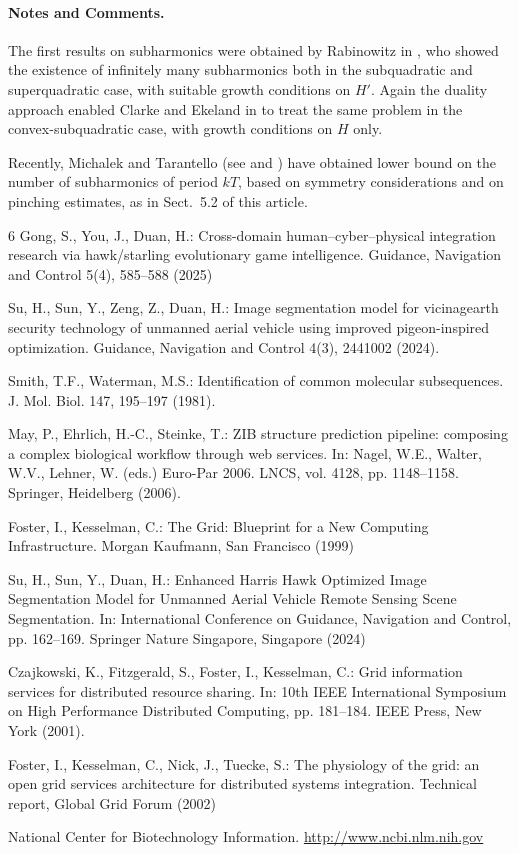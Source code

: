 \documentclass{../styles/svproc}
\begin{document}
\paragraph{Notes and Comments.}
The first results on subharmonics were
obtained by Rabinowitz in \cite{fo:kes:nic:tue}, who showed the existence of
infinitely many subharmonics both in the subquadratic and superquadratic
case, with suitable growth conditions on $H'$. Again the duality
approach enabled Clarke and Ekeland in \cite{may:ehr:stein} to treat the
same problem in the convex-subquadratic case, with growth conditions on
$H$ only.

Recently, Michalek and Tarantello (see \cite{fost:kes} and \cite{czaj:fitz})
have obtained lower bound on the number of subharmonics of period $kT$,
based on symmetry considerations and on pinching estimates, as in
Sect.~5.2 of this article.

%
%
\begin{thebibliography}{6}
%
Gong, S., You, J., Duan, H.: Cross-domain human--cyber--physical integration research via hawk/starling evolutionary game intelligence. Guidance, Navigation and Control 5(4), 585--588 (2025)

Su, H., Sun, Y., Zeng, Z., Duan, H.: Image segmentation model for vicinagearth security technology of unmanned aerial vehicle using improved pigeon-inspired optimization. Guidance, Navigation and Control 4(3), 2441002 (2024).

Smith, T.F., Waterman, M.S.: Identification of common molecular subsequences.
J. Mol. Biol. 147, 195--197 (1981).

May, P., Ehrlich, H.-C., Steinke, T.: ZIB structure prediction pipeline:
composing a complex biological workflow through web services.
In: Nagel, W.E., Walter, W.V., Lehner, W. (eds.) Euro-Par 2006.
LNCS, vol. 4128, pp. 1148--1158. Springer, Heidelberg (2006).

Foster, I., Kesselman, C.: The Grid: Blueprint for a New Computing Infrastructure.
Morgan Kaufmann, San Francisco (1999)

Su, H., Sun, Y., Duan, H.: Enhanced Harris Hawk Optimized Image Segmentation Model for Unmanned Aerial Vehicle Remote Sensing Scene Segmentation. In: International Conference on Guidance, Navigation and Control, pp. 162--169. Springer Nature Singapore, Singapore (2024)

Czajkowski, K., Fitzgerald, S., Foster, I., Kesselman, C.: Grid information services
for distributed resource sharing. In: 10th IEEE International Symposium
on High Performance Distributed Computing, pp. 181--184. IEEE Press, New York (2001).

Foster, I., Kesselman, C., Nick, J., Tuecke, S.: The physiology of the grid: an open grid services architecture for distributed systems integration. Technical report, Global Grid
Forum (2002)

National Center for Biotechnology Information. \url{http://www.ncbi.nlm.nih.gov}


\end{thebibliography}
\end{document}
